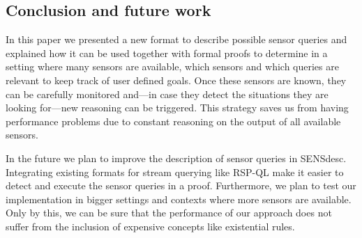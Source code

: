 \subsection{Conclusion and future work}\label{conclusion}
In this paper we presented a new format to describe possible sensor queries and explained how it can be used together with formal proofs to determine in a 
setting where many sensors are available, which sensors and which queries are relevant to keep track of user defined goals. Once these sensors are known, they can be carefully 
monitored and---in case they detect the situations they are looking for---new reasoning can be triggered. This strategy saves us from
having performance problems due to constant reasoning on the output of all available sensors.

In the future we plan to improve the description of sensor queries in SENSdesc. 
Integrating existing formats for stream querying like RSP-QL make it easier to 
detect and execute the sensor queries in a proof. Furthermore, we plan to test our implementation in bigger settings and contexts where more sensors are available.
Only by this, we can be sure that the performance of our approach does not suffer from the inclusion of expensive concepts like existential rules.




